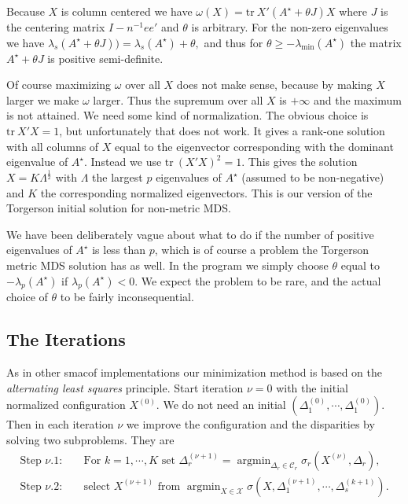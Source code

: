 \documentclass[
  12pt,
]{article}
\begin{document}
Because \(X\) is column centered we have
\(\omega(X)=\text{tr}\ X'(A^\star + \theta J)X\) where \(J\) is the
centering matrix \(I-n^{-1}ee'\) and \(\theta\) is arbitrary. For
the non-zero eigenvalues we have
\(\lambda_s(A^\star + \theta J))=\lambda_s(A^\star) + \theta,\)
and thus for \(\theta\geq-\lambda_{\text{min}}(A^\star)\) the matrix \(A^\star + \theta J\) is positive semi-definite.

Of course maximizing \(\omega\) over all \(X\) does not make sense, because
by making \(X\) larger we make \(\omega\) larger. Thus the supremum over all
\(X\) is \(+\infty\) and the maximum is not attained. We need some
kind of normalization. The obvious choice is \(\text{tr}\ X'X=1\), but
unfortunately that does not work. It gives a rank-one solution
with all columns of \(X\) equal to the eigenvector corresponding with the
dominant eigenvalue of \(A^\star\). Instead we use \(\text{tr}\ (X'X)^2=1\).
This gives the solution \(X=K\Lambda^\frac12\) with \(\Lambda\) the largest \(p\) eigenvalues of \(A^\star\) (assumed to be non-negative) and \(K\) the
corresponding normalized eigenvectors. This is our version of
the Torgerson initial solution for non-metric MDS.

We have been deliberately vague about what to do if the number of
positive eigenvalues of \(A^\star\) is less than \(p\), which is of
course a problem the Torgerson metric MDS solution has as well. In the
program we simply choose \(\theta\) equal to \(-\lambda_p(A^\star)\)
if \(\lambda_p(A^\star)<0\). We expect the problem to be rare, and
the actual choice of \(\theta\) to be fairly inconsequential.

\subsection{The Iterations}\label{the-iterations}

As in other smacof implementations our minimization method is based on the \emph{alternating least squares} principle. Start
iteration \(\nu=0\) with the initial normalized configuration \(X^{(0)}\). We do not need an initial \((\Delta_1^{(0)},\cdots,\Delta_1^{(0)})\). Then in each iteration \(\nu\) we improve the configuration and the disparities by solving two subproblems. They are
\begin{align}
\text{Step  }\nu.1:\quad&\text{For }k=1,\cdots,K\text{ set } \Delta_r^{(\nu+1)}=\mathop{\text{argmin}}_{\Delta_r\in\mathcal{C}_r}\sigma_r(X^{(\nu)},\Delta_r),\label{eq:alsprob1}\\
\text{Step  }\nu.2:\quad&\text{select }X^{(\nu+1)}\text{ from }\mathop{\text{argmin}}_{X\in\mathcal{X}}\sigma(X,\Delta_1^{(\nu+1)},\cdots,\Delta_s^{(k+1)}).\label{eq:alsprob2}
\end{align}
\end{document}
